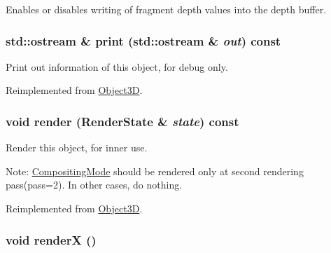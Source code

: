 Enables or disables writing of fragment depth values into the depth buffer. \hypertarget{classm3g_1_1CompositingMode_6fea17fa1532df3794f8cb39cb4f911f}{
\subsubsection[{print}]{\setlength{\rightskip}{0pt plus 5cm}std::ostream \& print (std::ostream \& {\em out}) const}}
\label{classm3g_1_1CompositingMode_6fea17fa1532df3794f8cb39cb4f911f}


Print out information of this object, for debug only. 

Reimplemented from \hyperlink{classm3g_1_1Object3D_6fea17fa1532df3794f8cb39cb4f911f}{Object3D}.\hypertarget{classm3g_1_1CompositingMode_8babc8a79b78615da51161e94029eea9}{
\subsubsection[{render}]{\setlength{\rightskip}{0pt plus 5cm}void render ({\bf RenderState} \& {\em state}) const}}
\label{classm3g_1_1CompositingMode_8babc8a79b78615da51161e94029eea9}


Render this object, for inner use.

Note: \hyperlink{classm3g_1_1CompositingMode}{CompositingMode} should be rendered only at second rendering pass(pass=2). In other cases, do nothing. 

Reimplemented from \hyperlink{classm3g_1_1Object3D_8babc8a79b78615da51161e94029eea9}{Object3D}.\hypertarget{classm3g_1_1CompositingMode_443a7a301f77f625335ecc06d13bad06}{
\subsubsection[{renderX}]{\setlength{\rightskip}{0pt plus 5cm}void renderX ()}}
\label{classm3g_1_1CompositingMode_443a7a301f77f625335ecc06d13bad06}


